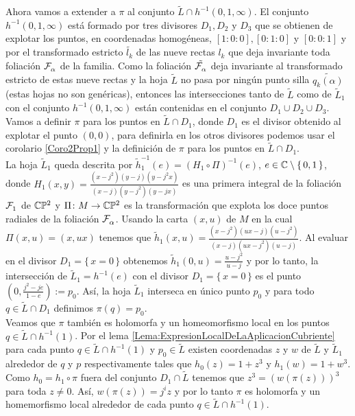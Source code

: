 Ahora vamos a extender a $\pi$ al conjunto $\tilde{L}\cap h^{-1}(0,1,\infty)$. El conjunto $h^{-1}(0,1,\infty)$ está formado por tres divisores $D_{1},D_{2}$ y $D_{3}$ que se obtienen de explotar los puntos, en coordenadas homogéneas, $[1:0:0],[0:1:0]$ y $[0:0:1]$ y por el transformado estricto $\tilde{\mathit{l}_{k}}$ de las nueve rectas $\mathit{l}_{k}$ que deja invariante toda foliación $\mathcal{F}^{\ }_{\alpha}$ de la familia. Como la foliación $\tilde{\mathcal{F}^{\ }_{\alpha}}$ deja invariante al transformado estricto de estas nueve rectas y la hoja $\tilde{L}$ no pasa por ningún punto silla $\tilde{q_{k}(\alpha)}$ (estas hojas no son genéricas), entonces las intersecciones tanto de $\tilde{L}$ como de $\tilde{L}_{1}$ con el conjunto $h^{-1}(0,1,\infty)$ están contenidas en el conjunto $D_{1}\cup D_{2}\cup D_{3}$. Vamos a definir $\pi$ para los puntos en $\tilde{L}\cap D_{1}$, donde $D_{1}$ es el divisor obtenido al explotar el punto $(0,0)$, para definirla en los otros divisores podemos usar el corolario \ref{Coro2Prop1} y la definición de $\pi$ para los puntos en $\tilde{L}\cap D_{1}$.\\

La hoja $\tilde{L}_{1}$ queda descrita por $\tilde{h}_{1}^{-1}(e)=(H_{1}\circ\Pi)^{-1}(e)$, $e\in\mathbb{C}\setminus\{\, 0,1 \, \}$, donde $H_{1}(x,y)=\tfrac{(x-j^{2})(y-j)(y-j^{2}x)}{(x-j)(y-j^{2})(y-jx)}$ es una primera integral de la foliación $\mathcal{F}^{\ }_{1}$ de $\mathbb{C}\mathbb{P}^2$ y $\Pi\colon M\rightarrow \mathbb{C}\mathbb{P}^2$ es la transformación que explota los doce puntos radiales de la foliación $\mathcal{F}^{\ }_{\alpha}$. Usando la carta $(x,u)$ de $M$ en la cual $\Pi(x,u)=(x,ux)$ tenemos que $\tilde{h}_{1}(x,u)=\tfrac{(x-j^{2})(ux-j)(u-j^{2})}{(x-j)(ux-j^{2})(u-j)}$. Al evaluar en el divisor $D_{1}=\{\, x=0\, \}$ obtenemos $\tilde{h}_{1}(0,u)=\tfrac{u-j^{2}}{u-j}$ y por lo tanto, la intersección de $\tilde{L}_{1}=h^{-1}(e)$ con el divisor $D_{1}=\{\, x=0\, \}$ es el punto $(0,\tfrac{j^{2}-je}{1-e}):=p_{0}$. Así, la hoja $\tilde{L}_{1}$ interseca en único punto $p_{0}$ y para todo $q\in\tilde{L}\cap D_{1}$ definimos $\pi(q)=p_{0}$.\\

Veamos que $\pi$ también es holomorfa y un homeomorfismo local en los puntos $q\in\tilde{L}\cap h^{-1}(1)$. Por el lema \ref{Lema:ExpresionLocalDeLaAplicacionCubriente} para cada punto $q\in\tilde{L}\cap h^{-1}(1)$ y $p_{0}\in\tilde{L}$ existen coordenadas $z$ y $w$ de $\tilde{L}$ y $\tilde{L}_{1}$ alrededor de $q$ y $p$ respectivamente tales que $h_{0}(z)=1+z^{3}$ y $h_{1}(w)=1+w^{3}$. Como $h_{0}=h_{1}\circ\pi$ fuera del conjunto $D_{1}\cap\tilde{L}$ tenemos que $z^{3}=(w(\pi(z)))^{3}$ para toda $z\neq 0$. Así, $w(\pi(z))=j^{i}z$ y por lo tanto $\pi$ es holomorfa y un homemorfismo local alrededor de cada punto $q\in\tilde{L}\cap h^{-1}(1)$.\\

